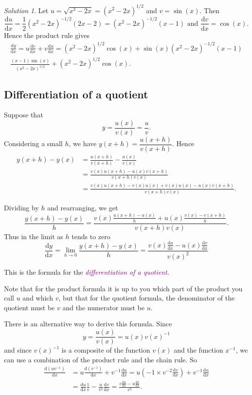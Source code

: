 \documentclass[
  english,
  11pt,
  oneside]{book}
\newcommand{\slide}{}
\theoremstyle{definition}
\theoremstyle{definition}
\theoremstyle{definition}
\theoremstyle{definition}
\theoremstyle{remark}
\newtheorem*{solution}{Solution}
\begin{document}
\begin{solution}
Let \(u = \sqrt{x^2-2x} = (x^2-2x)^{1/2}\) and \(v = \sin(x)\). Then
\[
\frac{\mathrm{d} u}{\mathrm{d} x} = \frac12(x^2-2x)^{-1/2}(2x-2)=(x^2-2x)^{-1/2}(x-1)\text{ and }\frac{\mathrm{d} v}{\mathrm{d} x} = \cos(x).
\]
Hence the product rule gives
\begin{gather*}
\frac{\mathrm{d} y}{\mathrm{d} x} = u\frac{\mathrm{d} v}{\mathrm{d} x} + v\frac{\mathrm{d} u}{\mathrm{d} x} = (x^2-2x)^{1/2}\cos(x) + \sin(x)(x^2-2x)^{-1/2}(x-1)\\
\frac{(x-1)\sin(x)}{(x^2-2x)^{1/2}} + (x^2-2x)^{1/2}\cos(x).
\end{gather*}
\end{solution}

\slide

\subsection{Differentiation of a quotient}\label{differentiation-of-a-quotient}

Suppose that
\[
y = \frac{u(x)}{v(x)} = \frac{u}{v}.
\]
Considering a small \(h\), we have \(y(x+h) = \dfrac{u(x+h)}{v(x+h)}\).
Hence
\begin{align*}
y(x+h)-y(x) &= \frac{u(x+h)}{v(x+h)} - \frac{u(x)}{v(x)}\\
&=\frac{v(x)u(x+h)-u(x)v(x+h)}{v(x+h)v(x)}\\
&=\tfrac{v(x)u(x+h)-v(x)u(x)+v(x)u(x)-u(x)v(x+h)}{v(x+h)v(x)}.
\end{align*}
\slide
Dividing by \(h\) and rearranging, we get
\[
\frac{y(x+h)-y(x)}{h} = \frac{v(x)\frac{u(x+h)-u(x)}{h}+u(x)\frac{v(x)-v(x+h)}{h}}{v(x+h)v(x)}.
\]
Thus in the limit as \(h\) tends to zero
\[\frac{\mathrm{d} y}{\mathrm{d} x} = \lim\limits_{h\to0}\frac{y(x+h)-y(x)}{h} = \frac{v(x)\frac{\mathrm{d} u}{\mathrm{d} x} - u(x)\frac{\mathrm{d} v}{\mathrm{d} x}}{v(x)^2}
\]

This is the formula for the \textcolor{purple}{\em differentiation of a quotient}.

Note that for the product formula it is up to you which part of the product you call \(u\) and which \(v\), but that for the quotient formula, the denominator of the quotient must be \(v\) and the numerator must be \(u\).
\slide

There is an alternative way to derive this formula. Since
\[
y = \frac{u(x)}{v(x)} = u(x)v(x)^{-1}
\]
and since \(v(x)^{-1}\) is a composite of the function \(v(x)\) and the function \(x^{-1}\), we can use a combination of the product rule and the chain rule. So
\begin{align*}
\frac{\mathrm{d}(uv^{-1})}{\mathrm{d} x} &= u\frac{\mathrm{d}(v^{-1})}{\mathrm{d} x}+v^{-1}\frac{\mathrm{d} u}{\mathrm{d} x} = u\left(-1\times v^{-2}\frac{\mathrm{d} v}{\mathrm{d} x}\right) + v^{-1}\frac{\mathrm{d} u}{\mathrm{d} x}\\
&= \frac{\mathrm{d} u}{\mathrm{d} x}\frac{1}{v} - \frac{u}{v^2}\frac{\mathrm{d} v}{\mathrm{d} x} = \frac{v\frac{\mathrm{d} u}{\mathrm{d} x}-u\frac{\mathrm{d} v}{\mathrm{d} x}}{v^2}.
\end{align*}
\slide
\end{document}
